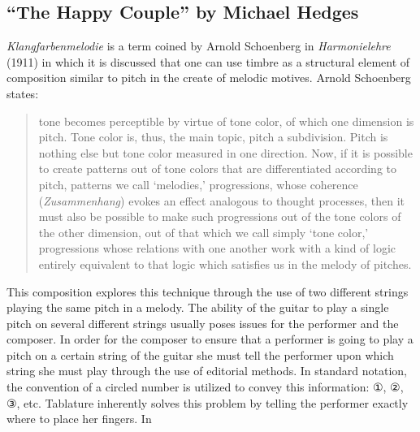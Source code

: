 \documentclass{tufte-handout}
\begin{document}
\subsection*{``The Happy Couple'' by Michael Hedges}
\emph{Klangfarbenmelodie} is a term coined by Arnold Schoenberg in
\emph{Harmonielehre} (1911) in which it is discussed that one can use timbre
as a structural element of composition similar to pitch in the create of
melodic motives. Arnold Schoenberg states:
\begin{quote}
  tone becomes perceptible by virtue of tone color, of which one dimension is
  pitch. Tone color is, thus, the main topic, pitch a subdivision. Pitch is
  nothing else but tone color measured in one direction. Now, if it is
  possible to create patterns out of tone colors that are differentiated
  according to pitch, patterns we call `melodies,' progressions, whose
  coherence (\emph{Zusammenhang}) evokes an effect analogous to thought
  processes, then it must also be possible to make such progressions out of
  the tone colors of the other dimension, out of that which we call simply
  `tone color,' progressions whose relations with one another work with a kind
  of logic entirely equivalent to that logic which satisfies us in the melody
  of pitches.
\end{quote}
This composition explores this technique through the use of two different
strings playing the same pitch in a melody. The ability of the guitar to play
a single pitch on several different strings usually poses issues for the
performer and the composer. In order for the composer to ensure that a
performer is going to play a pitch on a certain string of the guitar she must
tell the performer upon which string she must play through the use of
editorial methods. In standard notation, the convention of a circled number is
utilized to convey this information: ①, ②, ③, etc. Tablature inherently solves
this problem by telling the performer exactly where to place her fingers. In
\end{document}
